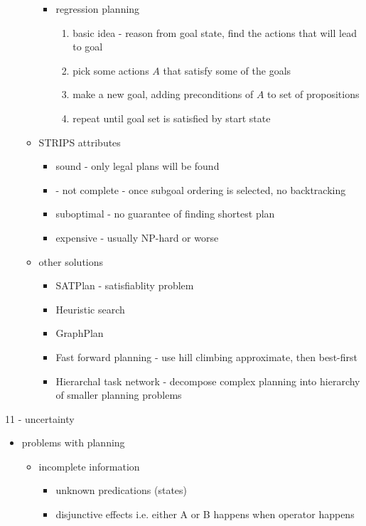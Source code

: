 \documentclass[11pt]{article}
\newcommand{\ee}[1]{\ensuremath{#1}}
\begin{document}
\begin{description}
\begin{itemize}
\begin{itemize}
\begin{itemize}
			\item regression planning
			\begin{enumerate}
				\item basic idea - reason from goal state, find the actions that will lead to goal
				\item pick some actions \ee{A} that satisfy some of the goals
				\item make a new goal, adding preconditions of \ee{A} to set of propositions
				\item repeat until goal set is satisfied by start state
			\end{enumerate}
		\end{itemize}
	
		\item STRIPS attributes
		\begin{itemize}
			\item sound - only legal plans will be found
			\item - not complete - once subgoal ordering is selected, no backtracking
			\item suboptimal - no guarantee of finding shortest plan
			\item expensive - usually NP-hard or worse
		\end{itemize}
	
		\item other solutions
		\begin{itemize}
			\item SATPlan - satisfiablity problem
			\item Heuristic search
			\item GraphPlan
			\item Fast forward planning - use hill climbing approximate, then best-first
			\item Hierarchal task network - decompose complex planning into hierarchy of smaller planning problems
		\end{itemize}
	\end{itemize}
\end{itemize}


\item 11 - uncertainty
\begin{itemize}
	
	\item problems with planning
	\begin{itemize}
		\item incomplete information
		\begin{itemize}
			\item unknown predications (states)
			\item disjunctive effects i.e. either A or B happens when operator happens
		\end{itemize}
	

\end{itemize}
\end{itemize}
\end{description}
\end{document}
